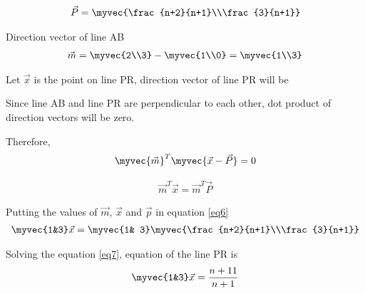 \documentclass[journal,12pt,twocolumn]{IEEEtran}
\begin{document}
\begin{align}\label{eq3}
\vec{P} = \myvec{\frac{n+2}{n+1}\\\frac{3}{n+1}}
\end{align}

Direction vector of line AB
\begin{align}\label{eq4}
 \vec{m}=\myvec{2\\3}-\myvec{1\\0} = \myvec{1\\3} 
\end{align}

Let $\vec{x}$ is the point on line PR, direction vector of line PR will be 

Since line AB and line PR are perpendicular to each other, dot product of direction vectors will be zero.

Therefore, 
\begin{align}\label{eq5}
\myvec{\vec{m}}^T\myvec{\vec{x}-\vec{P}}=0
\end{align}




\begin{align}\label{eq6}
\vec{m}^T\vec{x}=\vec{m}^T\vec{P}
\end{align}



Putting the values of $\vec{m}$, $\vec{x}$ and $\vec{p} $ in equation \eqref{eq6}
\begin{align}\label{eq7}
\myvec{1&3}\vec{x}=\myvec{1& 3}\myvec{\frac{n+2}{n+1}\\\frac{3}{n+1}}
\end{align}

Solving the equation \eqref{eq7}, 
equation of the line PR is
\begin{align}
\myvec{1&3}\vec{x} = \frac{n+11}{n+1}
\end{align}
\end{document}
